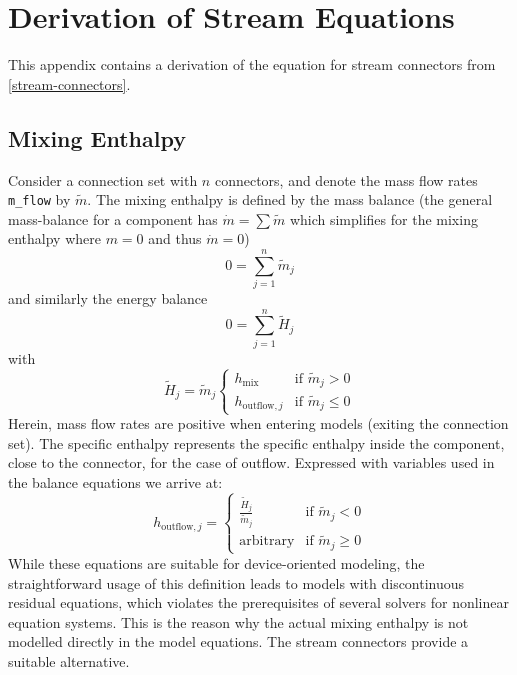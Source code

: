 \chapter{Derivation of Stream Equations}\label{derivation-of-stream-equations}

This appendix contains a derivation of the equation for stream connectors from \cref{stream-connectors}.

\section{Mixing Enthalpy}\label{reasons-for-avoiding-the-actual-mixing-enthalpy-in-connector-definitions}\label{mixing-enthalpy}

Consider a connection set with $n$ connectors, and denote the mass flow rates \lstinline!m_flow! by $\tilde{m}$.
The mixing enthalpy is defined by the mass balance (the general mass-balance for a component has $\dot{m}=\sum\tilde{m}$ which simplifies for the mixing enthalpy where $m=0$ and thus $\dot{m}=0$)
\begin{equation*}
0=\sum_{j=1}^n\tilde{m}_j
\end{equation*}
and similarly the energy balance
\begin{equation*}
0=\sum_{j=1}^n\tilde{H}_j
\end{equation*}
with
\begin{equation*}
\tilde{H}_j=\tilde{m}_j
\begin{cases}
h_{\mathrm{mix}}&\text{if $\tilde{m}_j>0$}\\
h_{\mathrm{outflow},j}&\text{if $\tilde{m}_j \leq 0$}
\end{cases}
\end{equation*}
Herein, mass flow rates are positive when entering models (exiting the connection set).
The specific enthalpy represents the specific enthalpy inside the component, close to the connector, for the case of outflow.
Expressed with variables used in the balance equations we arrive at:
\begin{equation*}
h_{\mathrm{outflow},j}=
\begin{cases}
\frac{\tilde{H}_j}{\tilde{m}_j}&\text{if $\tilde{m}_j<0$}\\
\textrm{arbitrary}&\text{if $\tilde{m}_j \geq 0$}
\end{cases}
\end{equation*}
While these equations are suitable for device-oriented modeling, the straightforward usage of this definition leads to models with discontinuous residual equations, which violates the prerequisites of several solvers for nonlinear equation systems.
This is the reason why the actual mixing enthalpy is not modelled directly in the model equations.
The stream connectors provide a suitable alternative.

